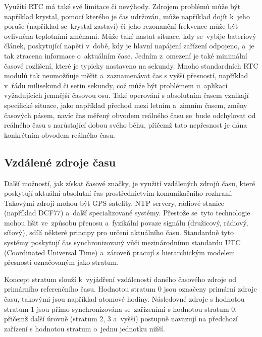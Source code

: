 Využití RTC má také své limitace či nevýhody. Zdrojem problémů může být například krystal, pomocí kterého je čas udržován, může například dojít k~jeho poruše (například se~krystal zastaví) či jeho rezonanční frekvence může být ovlivněna teplotními změnami. Může také nastat situace, kdy se~vybije bateriový článek, poskytující napětí v~době, kdy je hlavní napájení zařízení odpojeno, a~je tak ztracena informace o~aktuálním čase. Jedním z~omezení je také minimální časové rozlišení, které je typicky nastaveno na sekundy. Mnoho standardních RTC modulů tak neumožňuje měřit a~zaznamenávat čas s vyšší přesností, například v~řádu milisekund či setin sekundy, což může být problémem u~aplikací vyžadujících jemnější časovou osu. Také operování s absolutním časem vznikají specifické situace, jako například přechod mezi letním a~zimním časem, změny časových pásem, navíc čas měřený obvodem reálného času se~bude odchylovat od reálného času s narůstající dobou svého běhu, přičemž tato nepřesnost je dána konkrétním obvodem reálného času.~\cite{jameco_choosing_right_real_time_clock_chip_or_module, embed_journal_interfacing_rtc_with_microcontroler, medium_rtc}

\subsection{Vzdálené zdroje času}
Další možností, jak získat časové značky, je využití vzdálených zdrojů času, které poskytují aktuální absolutní čas prostřednictvím komunikačního rozhraní. Takovými zdroji mohou být GPS satelity, NTP servery, rádiové stanice (například DCF77) a~další specializované systémy. Přestože se~tyto technologie mohou lišit ve~způsobu přenosu a~fyzikální povaze signálu (družicový, rádiový, síťový), sdílí některé principy pro určení aktuálního času. Standardně tyto systémy poskytují čas synchronizovaný vůči mezinárodnímu standardu UTC (Coordinated Universal Time) a~zároveň pracují s hierarchickým modelem přesnosti označovaným jako stratum.~\cite{sparkfun_gps, sookocheff_ntp}

Koncept stratum slouží k~vyjádření vzdálenosti daného časového zdroje od primárního referenčního času. Hodnotou stratum 0 jsou označeny primární zdroje času, takovými jsou například atomové hodiny. Následovné zdroje s hodnotou stratum 1 jsou přímo synchronizována se~zařízeními s hodnotou stratum 0, přičemž další úrovně (stratum 2, 3 a~vyšší) postupně navazují na předchozí zařízení s hodnotou stratum o~jednu jednotku nižší.~\cite{sookocheff_ntp}

